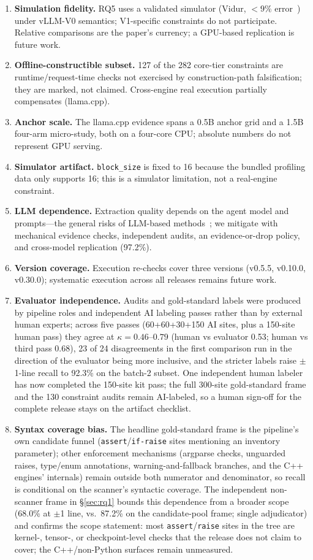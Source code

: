 \documentclass[journal]{IEEEtran}
\newcommand{\code}[1]{\texttt{#1}}
\begin{document}
\begin{enumerate}
  \item \textbf{Simulation fidelity.} RQ5 uses a validated simulator (Vidur, ${<}9\%$ error~\cite{ref6}) under vLLM-V0 semantics; V1-specific constraints do not participate. Relative comparisons are the paper's currency; a GPU-based replication is future work.
  \item \textbf{Offline-constructible subset.} 127 of the 282 core-tier constraints are runtime/request-time checks not exercised by construction-path falsification; they are marked, not claimed. Cross-engine real execution partially compensates (llama.cpp).
  \item \textbf{Anchor scale.} The llama.cpp evidence spans a 0.5B anchor grid and a 1.5B four-arm micro-study, both on a four-core CPU; absolute numbers do not represent GPU serving.
  \item \textbf{Simulator artifact.} \code{block\_size} is fixed to 16 because the bundled profiling data only supports 16; this is a simulator limitation, not a real-engine constraint.
  \item \textbf{LLM dependence.} Extraction quality depends on the agent model and prompts---the general risks of LLM-based methods~\cite{ref19}; we mitigate with mechanical evidence checks, independent audits, an evidence-or-drop policy, and cross-model replication (97.2\%).
  \item \textbf{Version coverage.} Execution re-checks cover three versions (v0.5.5, v0.10.0, v0.30.0); systematic execution across all releases remains future work.
  \item \textbf{Evaluator independence.} Audits and gold-standard labels were produced by pipeline roles and independent AI labeling passes rather than by external human experts; across five passes (60+60+30+150 AI sites, plus a 150-site human pass) they agree at $\kappa = 0.46$--$0.79$ (human vs evaluator 0.53; human vs third pass 0.68), 23 of 24 disagreements in the first comparison run in the direction of the evaluator being more inclusive, and the stricter labels raise $\pm$1-line recall to 92.3\% on the batch-2 subset. One independent human labeler has now completed the 150-site kit pass; the full 300-site gold-standard frame and the 130 constraint audits remain AI-labeled, so a human sign-off for the complete release stays on the artifact checklist.
  \item \textbf{Syntax coverage bias.} The headline gold-standard frame is the pipeline's own candidate funnel (\code{assert}/\code{if-raise} sites mentioning an inventory parameter); other enforcement mechanisms (argparse checks, unguarded raises, type/enum annotations, warning-and-fallback branches, and the C++ engines' internals) remain outside both numerator and denominator, so recall is conditional on the scanner's syntactic coverage. The independent non-scanner frame in \S\ref{sec:rq1} bounds this dependence from a broader scope (68.0\% at $\pm$1 line, vs.\ 87.2\% on the candidate-pool frame; single adjudicator) and confirms the scope statement: most \code{assert}/\code{raise} sites in the tree are kernel-, tensor-, or checkpoint-level checks that the release does not claim to cover; the C++/non-Python surfaces remain unmeasured.

\end{enumerate}
\end{document}
